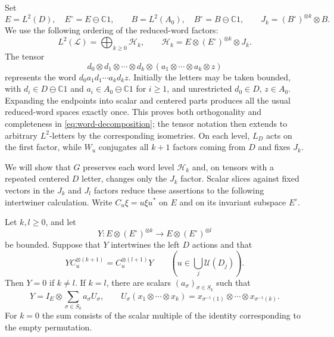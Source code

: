 Set
\[
 E=L^2(D),\quad E^\circ=E\ominus\mathbb C1,
 \qquad B=L^2(A_0),\quad B^\circ=B\ominus\mathbb C1,
 \qquad J_k=(B^\circ)^{\otimes k}\otimes B.
\]
We use the following ordering of the reduced-word factors:
\begin{equation}\label{eq:word-decomposition}
 L^2(\mathcal L)
   =\bigoplus_{k\geq0}\mathcal H_k,
 \qquad
 \mathcal H_k=E\otimes(E^\circ)^{\otimes k}\otimes J_k.
\end{equation}
The tensor
\[
 d_0\otimes d_1\otimes\cdots\otimes d_k
       \otimes(a_1\otimes\cdots\otimes a_k\otimes z)
\]
represents the word $d_0a_1d_1\cdots a_kd_kz$.  Initially the
letters may be taken bounded, with $d_i\in D\ominus\mathbb C1$
and $a_i\in A_0\ominus\mathbb C1$ for $i\geq1$, and unrestricted
$d_0\in D$, $z\in A_0$.  Expanding the endpoints into scalar and
centered parts produces all the usual reduced-word spaces exactly
once.  This proves both orthogonality and completeness in
\eqref{eq:word-decomposition}; the tensor notation then extends to
arbitrary $L^2$-letters by the corresponding isometries.
On each level, $L_D$ acts on the first factor, while $W_u$ conjugates
all $k+1$ factors coming from $D$ and fixes $J_k$.

We will show that $G$ preserves each word level $\mathcal H_k$ and, on
tensors with a repeated centered $D$ letter, changes only the $J_k$ factor.
Scalar slices against fixed vectors in the $J_k$ and $J_l$ factors reduce
these assertions to the following intertwiner calculation.
Write $C_u\xi=u\xi u^*$ on $E$ and on its invariant
subspace $E^\circ$.

\begin{lemma}\label{lem:invariant-intertwiners}
Let $k,l\geq0$, and let
\[
 Y:E\otimes(E^\circ)^{\otimes k}
       \longrightarrow E\otimes(E^\circ)^{\otimes l}
\]
be bounded.  Suppose that $Y$ intertwines the left $D$ actions and
that
\[
 Y C_u^{\otimes(k+1)}=C_u^{\otimes(l+1)}Y
 \qquad(u\in\bigcup_j\mathcal U(D_j)).
\]
Then $Y=0$ if $k\ne l$.  If $k=l$, there are scalars
$(a_\sigma)_{\sigma\in S_k}$ such that
\[
 Y=I_E\otimes\sum_{\sigma\in S_k}a_\sigma U_\sigma,
 \qquad
 U_\sigma(x_1\otimes\cdots\otimes x_k)
   =x_{\sigma^{-1}(1)}\otimes\cdots\otimes x_{\sigma^{-1}(k)}.
\]
For $k=0$ the sum consists of the scalar multiple of the identity
corresponding to the empty permutation.
\end{lemma}

